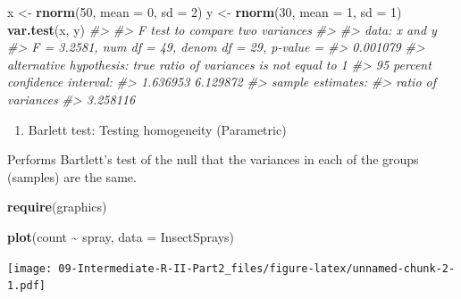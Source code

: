 \documentclass[
]{book}
\newenvironment{Shaded}{\begin{snugshade}}{\end{snugshade}}
\newcommand{\AttributeTok}[1]{\textcolor[rgb]{0.13,0.29,0.53}{#1}}
\newcommand{\CommentTok}[1]{\textcolor[rgb]{0.56,0.35,0.01}{\textit{#1}}}
\newcommand{\DecValTok}[1]{\textcolor[rgb]{0.00,0.00,0.81}{#1}}
\newcommand{\FunctionTok}[1]{\textcolor[rgb]{0.13,0.29,0.53}{\textbf{#1}}}
\newcommand{\NormalTok}[1]{#1}
\newcommand{\OtherTok}[1]{\textcolor[rgb]{0.56,0.35,0.01}{#1}}
\newcommand{\SpecialCharTok}[1]{\textcolor[rgb]{0.81,0.36,0.00}{\textbf{#1}}}
\providecommand{\tightlist}{%
  \setlength{\itemsep}{0pt}\setlength{\parskip}{0pt}}
\begin{document}
\begin{Shaded}
\begin{Highlighting}[]
\NormalTok{x }\OtherTok{\textless{}{-}} \FunctionTok{rnorm}\NormalTok{(}\DecValTok{50}\NormalTok{, }\AttributeTok{mean =} \DecValTok{0}\NormalTok{, }\AttributeTok{sd =} \DecValTok{2}\NormalTok{)}
\NormalTok{y }\OtherTok{\textless{}{-}} \FunctionTok{rnorm}\NormalTok{(}\DecValTok{30}\NormalTok{, }\AttributeTok{mean =} \DecValTok{1}\NormalTok{, }\AttributeTok{sd =} \DecValTok{1}\NormalTok{)}
\FunctionTok{var.test}\NormalTok{(x, y)}
\CommentTok{\#\textgreater{} }
\CommentTok{\#\textgreater{}  F test to compare two variances}
\CommentTok{\#\textgreater{} }
\CommentTok{\#\textgreater{} data:  x and y}
\CommentTok{\#\textgreater{} F = 3.2581, num df = 49, denom df = 29, p{-}value =}
\CommentTok{\#\textgreater{} 0.001079}
\CommentTok{\#\textgreater{} alternative hypothesis: true ratio of variances is not equal to 1}
\CommentTok{\#\textgreater{} 95 percent confidence interval:}
\CommentTok{\#\textgreater{}  1.636953 6.129872}
\CommentTok{\#\textgreater{} sample estimates:}
\CommentTok{\#\textgreater{} ratio of variances }
\CommentTok{\#\textgreater{}           3.258116}
\end{Highlighting}
\end{Shaded}

\begin{enumerate}
\def\labelenumi{\alph{enumi}.}
\setcounter{enumi}{1}
\tightlist
\item
  Barlett test: Testing homogeneity (Parametric)
\end{enumerate}

Performs Bartlett's test of the null that the variances in each of the groups (samples) are the same.

\begin{Shaded}
\begin{Highlighting}[]
\FunctionTok{require}\NormalTok{(graphics)}

\FunctionTok{plot}\NormalTok{(count }\SpecialCharTok{\textasciitilde{}}\NormalTok{ spray, }\AttributeTok{data =}\NormalTok{ InsectSprays)}
\end{Highlighting}
\end{Shaded}

\texttt{[image: 09-Intermediate-R-II-Part2\_files/figure-latex/unnamed-chunk-2-1.pdf]}

\begin{Shaded}
\end{Shaded}
\end{document}

